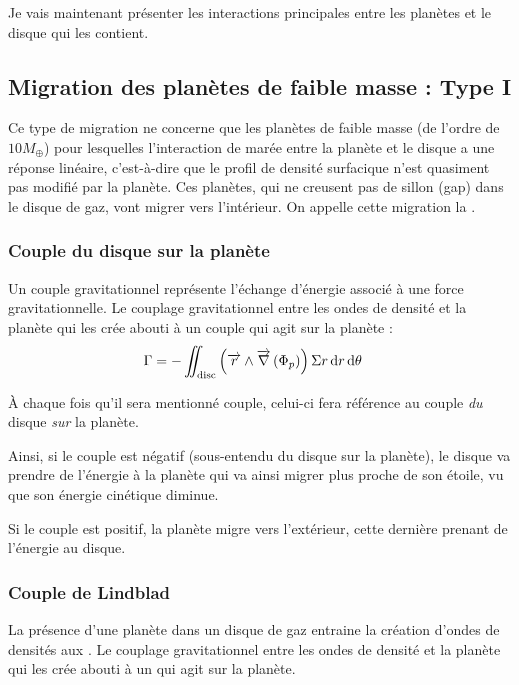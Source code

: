 Je vais maintenant présenter les interactions principales entre les planètes et le disque qui les contient. 

\subsection{Migration des planètes de faible masse : Type I}
Ce type de migration ne concerne que les planètes de faible masse (de l'ordre de $10M_{\oplus}$) pour lesquelles l'interaction de marée entre la planète et le disque a une réponse linéaire, c'est-à-dire que le profil de densité surfacique n'est quasiment pas modifié par la planète. Ces planètes, qui ne creusent pas de sillon (gap) dans le disque de gaz, vont migrer vers l'intérieur. On appelle cette migration la .


\subsubsection{Couple du disque sur la planète}
Un couple gravitationnel représente l'échange d'énergie associé à une force gravitationnelle.  Le couplage gravitationnel entre les ondes de densité et la planète qui les crée abouti à un couple qui agit sur la planète : 
\begin{align}
\Gamma &= - \iint_\text{disc} \left({\overrightarrow{r}}\wedge{\overrightarrow{\nabla}} \left( \Phi_p\right)\right)\Sigma r \operatorname{d \!} r \operatorname{d \!} \theta
\end{align}

À chaque fois qu'il sera mentionné \og couple\fg, celui-ci fera référence au couple \emph{du} disque \emph{sur} la planète.

Ainsi, si le couple est négatif (sous-entendu du disque sur la planète), le disque va prendre de l'énergie à la planète qui va ainsi migrer plus proche de son étoile, vu que son énergie cinétique diminue.

Si le couple est positif, la planète migre vers l'extérieur, cette dernière prenant de l'énergie au disque.

\subsubsection{Couple de Lindblad}
La présence d'une planète dans un disque de gaz entraine la création d'ondes de densités aux  \citep{goldreich1979excitation}. Le couplage gravitationnel entre les ondes de densité et la planète qui les crée abouti à un  qui agit sur la planète.

